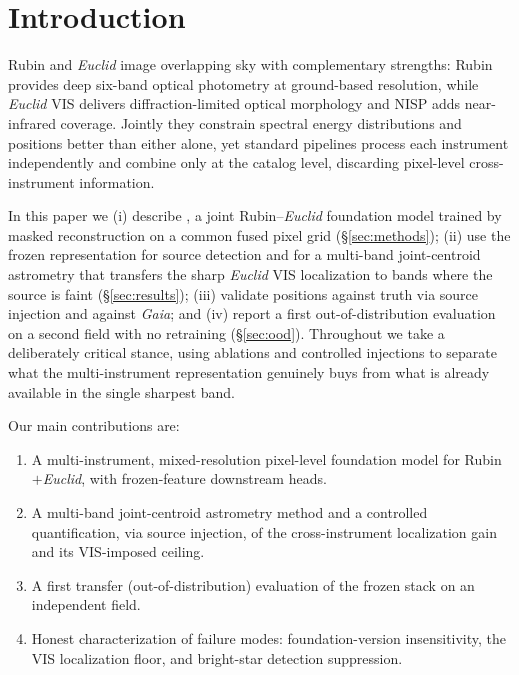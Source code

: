\section{Introduction}
\label{sec:intro}

Rubin and \textit{Euclid} image overlapping sky with complementary strengths:
Rubin provides deep six-band optical photometry at ground-based resolution,
while \textit{Euclid} VIS delivers diffraction-limited optical morphology and
NISP adds near-infrared coverage. Jointly they constrain spectral energy
distributions and positions better than either alone, yet standard pipelines
process each instrument independently and combine only at the catalog level,
discarding pixel-level cross-instrument information.


In this paper we (i) describe \jaisp{}, a joint Rubin--\textit{Euclid}
foundation model trained by masked reconstruction on a common fused pixel grid
(\S\ref{sec:methods}); (ii) use the frozen representation for source detection
and for a multi-band joint-centroid astrometry that transfers the sharp
\textit{Euclid} VIS localization to bands where the source is faint
(\S\ref{sec:results}); (iii) validate positions against truth via
source injection and against \textit{Gaia}; and (iv) report a first
out-of-distribution evaluation on a second field with no retraining
(\S\ref{sec:ood}). Throughout we take a deliberately critical stance, using
ablations and controlled injections to separate what the multi-instrument
representation genuinely buys from what is already available in the single
sharpest band.

Our main contributions are:
\begin{enumerate}
  \item A multi-instrument, mixed-resolution pixel-level foundation model for
    Rubin$+$\textit{Euclid}, with frozen-feature downstream heads.
  \item A multi-band joint-centroid astrometry method and a controlled
    quantification, via source injection, of the cross-instrument localization
    gain and its VIS-imposed ceiling.
  \item A first transfer (out-of-distribution) evaluation of the frozen stack
    on an independent field.
  \item Honest characterization of failure modes: foundation-version
    insensitivity, the VIS localization floor, and bright-star detection
    suppression.
\end{enumerate}
